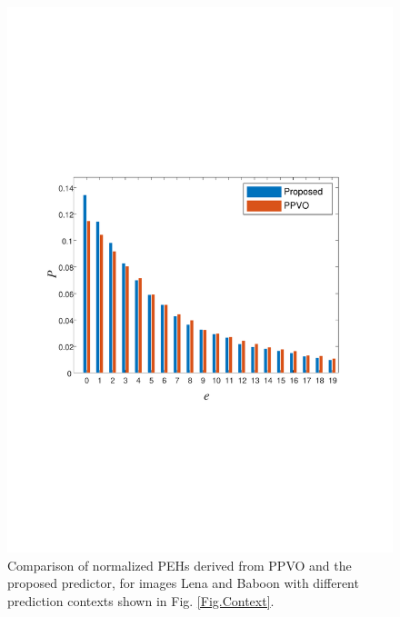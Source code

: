 \documentclass[review,3p,10pt,sort&compress]{elsarticle}
\begin{document}
\begin{figure}[t]
{\begin{minipage}[t]{0.4\linewidth}
    \includegraphics[width=1\textwidth]{figures/Comp8Baboon.pdf}
    \end{minipage}
}
\caption{Comparison of normalized PEHs derived from PPVO \cite{Qu2015PPVO} and the proposed predictor, for images Lena and Baboon with different prediction contexts shown in Fig. \ref{Fig.Context}.}
\label{Fig.ComparisonEPPVO}
\end{figure}
\end{document}
